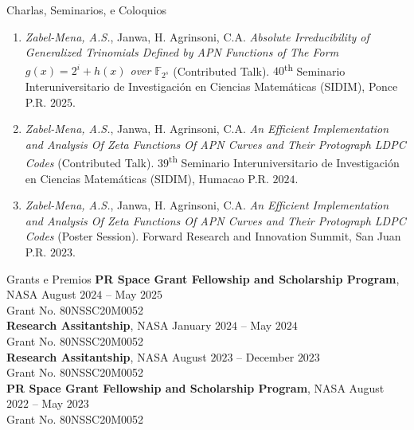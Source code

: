 \documentclass{resume}
\begin{document}
\begin{rSection}{Charlas, Seminarios, e Coloquios}
  \begin{enumerate}
    \item \textit{Zabel-Mena, A.S.}, Janwa, H. Agrinsoni, C.A.
      \textit{Absolute Irreducibility of Generalized
        Trinomials Defined by APN Functions of The Form
      $g(x)=2^{i}+h(x)$ over $\mathbb{F}_{2^s}$} (Contributed Talk).
      $40$\textsuperscript{th} Seminario Interuniversitario de
      Investigaci\'on en Ciencias Matem\'aticas (SIDIM), Ponce P.R.
      $2025$.

    \item \textit{Zabel-Mena, A.S.}, Janwa, H. Agrinsoni, C.A.
      \textit{An Efficient Implementation and Analysis Of Zeta
      Functions Of APN Curves and Their Protograph LDPC Codes}
      (Contributed Talk). $39$\textsuperscript{th} Seminario
      Interuniversitario de Investigaci\'on en Ciencias Matem\'aticas
      (SIDIM), Humacao P.R. $2024$.

    \item \textit{Zabel-Mena, A.S.}, Janwa, H. Agrinsoni, C.A.
      \textit{An Efficient Implementation and Analysis Of Zeta
      Functions Of APN Curves and Their Protograph LDPC Codes}
      (Poster Session). Forward Research and Innovation Summit, San
      Juan P.R. $2023$.
  \end{enumerate}
\end{rSection}

\begin{rSection}{Grants e Premios}
  \textbf{PR Space Grant Fellowship and Scholarship Program}, NASA
  \hfill{August $2024$ -- May $2025$} \\
  Grant No. 80NSSC20M0052 \\

  \textbf{Research Assitantship}, NASA
  \hfill{January $2024$ -- May $2024$} \\
  Grant No. 80NSSC20M0052 \\

  \textbf{Research Assitantship}, NASA
  \hfill{August $2023$ -- December $2023$} \\
  Grant No. 80NSSC20M0052 \\

  \textbf{PR Space Grant Fellowship and Scholarship Program}, NASA
  \hfill{August $2022$ -- May $2023$} \\
  Grant No. 80NSSC20M0052 \\
\end{rSection}
\end{document}
